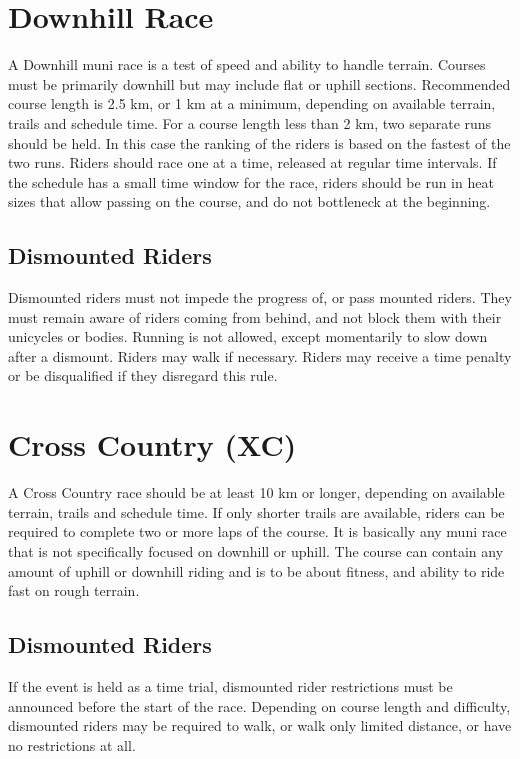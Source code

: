 \section{Downhill Race \label{sec:muni_downhill}}
A Downhill muni race is a test of speed and ability to handle terrain.
Courses must be primarily downhill but may include flat or uphill sections.
Recommended course length is 2.5 km, or 1 km at a minimum, depending on available terrain, trails and schedule time.
For a course length less than 2 km, two separate runs should be held.
In this case the ranking of the riders is based on the fastest of the two runs.
Riders should race one at a time, released at regular time intervals.
If the schedule has a small time window for the race, riders should be run in heat sizes that allow passing on the course, and do not bottleneck at the beginning.

\subsection{Dismounted Riders}
Dismounted riders must not impede the progress of, or pass mounted riders.
They must remain aware of riders coming from behind, and not block them with their
unicycles or bodies.
Running is not allowed, except momentarily to slow down after a dismount.
Riders may walk if necessary.
Riders may receive a time penalty or be disqualified if they disregard this rule.

\section{Cross Country (XC)\label{sec:muni_xc}}
A Cross Country race should be at least 10 km or longer, depending on available terrain, trails and schedule time.
If only shorter trails are available, riders can be required to complete two or more laps of the course.
It is basically any muni race that is not specifically focused on downhill or uphill.
The course can contain any amount of uphill or downhill riding and is to be about fitness, and ability to ride fast on rough terrain.

\subsection{Dismounted Riders}
If the event is held as a time trial, dismounted rider restrictions must be announced before the start of the race.
Depending on course length and difficulty, dismounted riders may be required to walk, or walk only limited distance, or have no restrictions at all.

